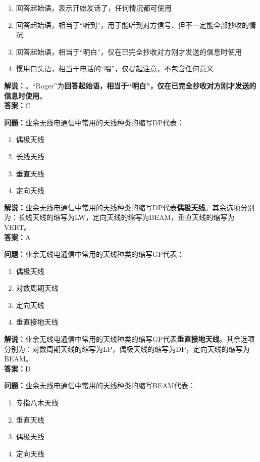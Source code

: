 \begin{enumerate}[label=\Alph*), leftmargin=1.5cm]
	\item 回答起始语，表示开始发话了，任何情况都可使用
	\item 回答起始语，相当于“听到”，用于能听到对方信号、但不一定能全部抄收的情况
	\item 回答起始语，相当于“明白”，仅在已完全抄收对方刚才发送的信息时使用
	\item 惯用口头语，相当于电话的“喂”，仅提起注意，不包含任何意义
\end{enumerate}

\textbf{解说：}。“Roger”为\textbf{回答起始语，相当于“明白”，仅在已完全抄收对方刚才发送的信息时使用}。\\\textbf{答案：}C



\textbf{问题：}业余无线电通信中常用的天线种类的缩写DP代表：

\begin{enumerate}[label=\Alph*), leftmargin=1.5cm]
	\item 偶极天线
	\item 长线天线
	\item 垂直天线
	\item 定向天线
\end{enumerate}

\textbf{解说：}业余无线电通信中常用的天线种类的缩写DP代表\textbf{偶极天线}。其余选项分别为：长线天线的缩写为LW，定向天线的缩写为BEAM，垂直天线的缩写为VERT。\\\textbf{答案：}A



\textbf{问题：}业余无线电通信中常用的天线种类的缩写GP代表：

\begin{enumerate}[label=\Alph*), leftmargin=1.5cm]
	\item 偶极天线
	\item 对数周期天线
	\item 定向天线
	\item 垂直接地天线
\end{enumerate}

\textbf{解说：}业余无线电通信中常用的天线种类的缩写GP代表\textbf{垂直接地天线}。其余选项分别为：对数周期天线的缩写为LP，偶极天线的缩写为DP，定向天线的缩写为BEAM。\\\textbf{答案：}D



\textbf{问题：}业余无线电通信中常用的天线种类的缩写BEAM代表：

\begin{enumerate}[label=\Alph*), leftmargin=1.5cm]
	\item 专指八木天线
	\item 垂直天线
	\item 偶极天线
	\item 定向天线
\end{enumerate}

